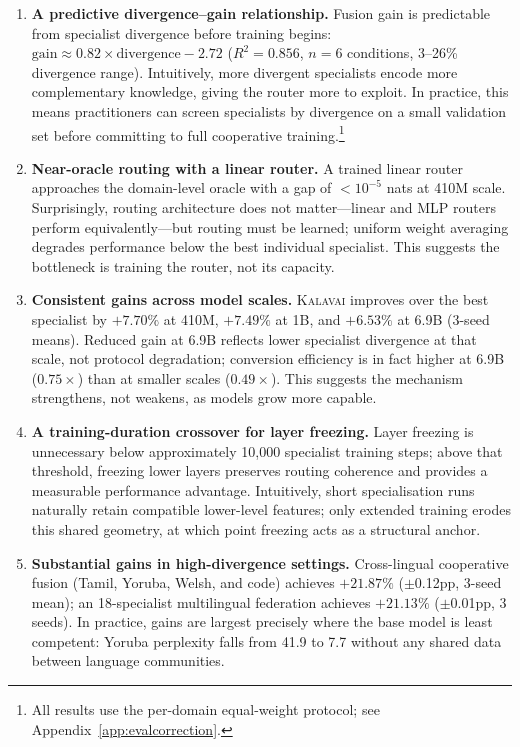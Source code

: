 \documentclass{article}
\newcommand{\kalavai}{\textsc{Kalavai}\xspace}
\begin{document}
\begin{enumerate}[leftmargin=*, itemsep=2pt]
\item \textbf{A predictive divergence--gain relationship.}
Fusion gain is predictable from specialist divergence before training begins:
$\text{gain} \approx 0.82 \times \text{divergence} - 2.72$
($R^2 = 0.856$, $n{=}6$ conditions, 3--26\% divergence range).
Intuitively, more divergent specialists encode more complementary knowledge,
giving the router more to exploit. In practice, this means practitioners can
screen specialists by divergence on a small validation set before committing
to full cooperative training.\footnote{All results use the per-domain equal-weight protocol; see Appendix~\ref{app:evalcorrection}.}

\item \textbf{Near-oracle routing with a linear router.}
A trained linear router approaches the domain-level oracle with a gap of
${<}10^{-5}$ nats at 410M scale. Surprisingly, routing architecture does not
matter---linear and MLP routers perform equivalently---but routing must be
learned; uniform weight averaging degrades performance below the best individual
specialist. This suggests the bottleneck is training the router, not its capacity.

\item \textbf{Consistent gains across model scales.}
\kalavai improves over the best specialist by $+7.70\%$ at 410M, $+7.49\%$ at
1B, and $+6.53\%$ at 6.9B (3-seed means). Reduced gain at 6.9B reflects lower
specialist divergence at that scale, not protocol degradation; conversion
efficiency is in fact higher at 6.9B ($0.75\times$) than at smaller scales
($0.49\times$). This suggests the mechanism strengthens, not weakens, as models
grow more capable.

\item \textbf{A training-duration crossover for layer freezing.}
Layer freezing is unnecessary below approximately 10,000 specialist training
steps; above that threshold, freezing lower layers preserves routing coherence
and provides a measurable performance advantage. Intuitively, short specialisation
runs naturally retain compatible lower-level features; only extended training
erodes this shared geometry, at which point freezing acts as a structural anchor.

\item \textbf{Substantial gains in high-divergence settings.}
Cross-lingual cooperative fusion (Tamil, Yoruba, Welsh, and code) achieves
$+21.87\%$ ($\pm$0.12pp, 3-seed mean); an 18-specialist multilingual federation
achieves $+21.13\%$ ($\pm$0.01pp, 3 seeds). In practice, gains are largest
precisely where the base model is least competent: Yoruba perplexity falls from
41.9 to 7.7 without any shared data between language communities.
\end{enumerate}
\end{document}
